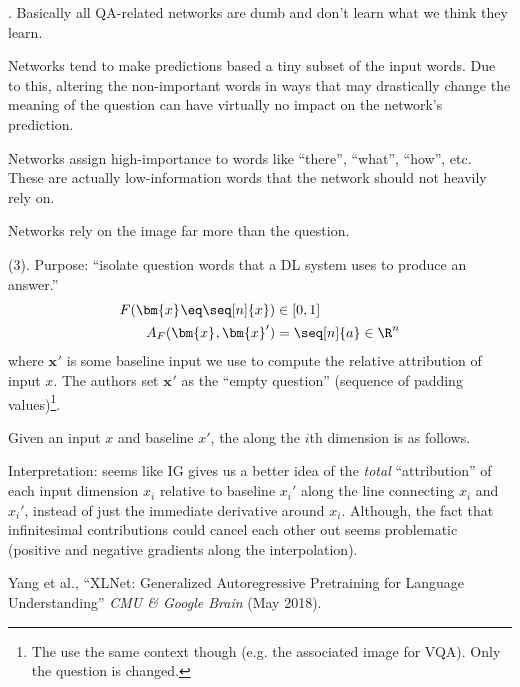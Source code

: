 \documentclass[11pt]{article}
\renewcommand\vec[2][]{\bm{#2}_{#1}}
\newcommand\myspace[1][]{\vspace{#1\bigskipamount}}
\newcommand\p{\Needspace{10\baselineskip} \noindent}
\newcommand\bluesec[1]{\myspace \p \blue{#1}}
\begin{document}
\bluesec{TL;DR}. Basically all QA-related networks are dumb and don't learn what we think they learn. 
\begin{compactitem}
	\item Networks tend to make predictions based a tiny subset of the input words. Due to this, altering the non-important words in ways that may drastically change the meaning of the question can have virtually no impact on the network's prediction. 
	
	\item Networks assign high-importance to words like ``there'', ``what'', ``how'', etc. These are actually low-information words that the network should not heavily rely on.
	
	\item Networks rely on the image far more than the question.  
\end{compactitem}

\bluesec{Integrated Gradients (IG)} (3). Purpose: ``isolate question words that a DL system uses to produce an answer.''
\begin{align}
	F(\vec x \eq \seq[n]{x}) &\in [0, 1] \\
	A_F(\vec x, \vec x')
		&= \seq[n]{a} \in \R^n
\end{align}
where $\vec x'$ is some baseline input we use to compute the relative attribution of input $x$. The authors set $\vec x'$ as the ``empty question'' (sequence of padding values)\footnote{The use the same context though (e.g. the associated image for VQA). Only the question is changed.}.

\begin{definition}
	Given an input $x$ and baseline $x'$, the  along the $i$th dimension is as follows.
\end{definition}
Interpretation: seems like IG gives us a better idea of the \textit{total} ``attribution'' of each input dimension $x_i$ relative to baseline $x_i'$ along the line connecting $x_i$ and $x_i'$, instead of just the immediate derivative around $x_i$. Although, the fact that infinitesimal contributions could cancel each other out seems problematic (positive and negative gradients along the interpolation). 







\vspace{-1em}
{\footnotesize Yang et al., ``XLNet: Generalized Autoregressive Pretraining for Language Understanding'' \textit{CMU \& Google Brain} (May 2018).}
\end{document}
